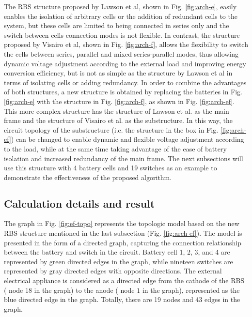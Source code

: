 \documentclass{article}
\begin{document}
The RBS structure proposed by Lawson et al\cite{lawsonSoftwareConfigurableBattery2012}, shown in Fig. \ref{fig:arch-e}, easily enables the isolation of arbitrary cells or the addition of redundant cells to the system, but these cells are limited to being connected in series only and the switch between cells connection modes is not flexible. 
In contrast, the structure proposed by Visairo et al\cite{visairoReconfigurableBatteryPack2008}, shown in Fig. \ref{fig:arch-f}, allows the flexibility to switch the cells between series, parallel and mixed series-parallel modes, thus allowing dynamic voltage adjustment according to the external load and improving energy conversion efficiency, but is not as simple as the structure by Lawson et al in terms of isolating cells or adding redundancy.
In order to combine the advantages of both structures, a new structure is obtained by replacing the batteries in Fig. \ref{fig:arch-e} with the structure in Fig. \ref{fig:arch-f}, as shown in Fig. \ref{fig:arch-ef}.
This more complex structure has the structure of Lawson et al.\cite{lawsonSoftwareConfigurableBattery2012} as the main frame and the structure of Visairo et al.\cite{visairoReconfigurableBatteryPack2008} as the substructure.
In this way, the circuit topology of the substructure (i.e. the structure in the box in Fig. \ref{fig:arch-ef}) can be changed to enable dynamic and flexible voltage adjustment according to the load, while at the same time taking advantage of the ease of battery isolation and increased redundancy of the main frame.
The next subsections will use this structure with 4 battery cells and 19 switches as an example to demonstrate the effectiveness of the proposed algorithm.

\subsection{Calculation details and result}

The graph in Fig. \ref{fig:ef-topo} represents the topologic model based on the new RBS structure mentioned in the last subsection (Fig. \ref{fig:arch-ef}).
The model is presented in the form of a directed graph, capturing the connection relationship between the battery and switch in the circuit.
Battery cell 1, 2, 3, and 4 are represented by green directed edges in the graph, while nineteen switches are represented by gray directed edges with opposite directions.
The external electrical appliance is considered as a directed edge from the cathode of the RBS ( node $18$ in the graph) to the anode ( node $1$ in the graph), represented as the blue directed edge in the graph.
Totally, there are 19 nodes and 43 edges in the graph.
\end{document}
